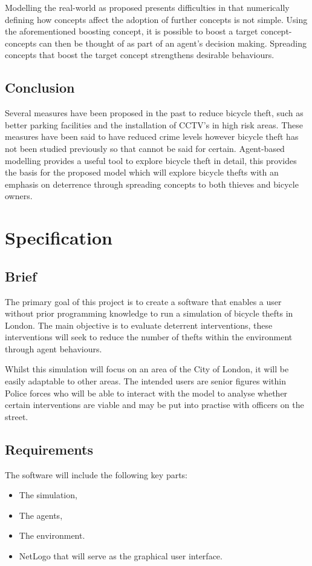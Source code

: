 \documentclass[11pt]{informatics-report}
\begin{document}
Modelling the real-world as proposed presents difficulties in that numerically defining how concepts affect the adoption of further concepts is not simple. Using the aforementioned boosting concept, it is possible to boost a target concept- concepts can then be thought of as part of an agent's decision making. Spreading concepts that boost the target concept strengthens desirable behaviours. 

\section{Conclusion}
Several measures have been proposed in the past to reduce bicycle theft, such as better parking facilities and the installation of CCTV's  in high risk areas. These measures have been said to have reduced crime levels however bicycle theft has not been studied previously so that cannot be said for certain. Agent-based modelling provides a useful tool to explore bicycle theft in detail, this provides the basis for the proposed model which will explore bicycle thefts with an emphasis on deterrence through spreading concepts to both thieves and bicycle owners.

\chapter{Specification}

\section{Brief}
The primary goal of this project is to create a software that enables a user without prior programming knowledge to run a simulation of bicycle thefts in London. The main objective is to  evaluate deterrent interventions, these interventions will seek to reduce the number of thefts within the environment through agent behaviours. \par 

Whilst this simulation will focus on an area of the City of London, it will be easily adaptable to other areas. The intended users are senior figures within Police forces who will be able to interact with the model to analyse whether certain interventions are viable and may be put into practise with officers on the street. 

\section{Requirements}
The software will include the following key parts:
\begin{itemize}
	\item The simulation,
	\item The agents,
	\item The environment.
	\item NetLogo that will serve as the graphical user interface.
\end{itemize}
\end{document}
